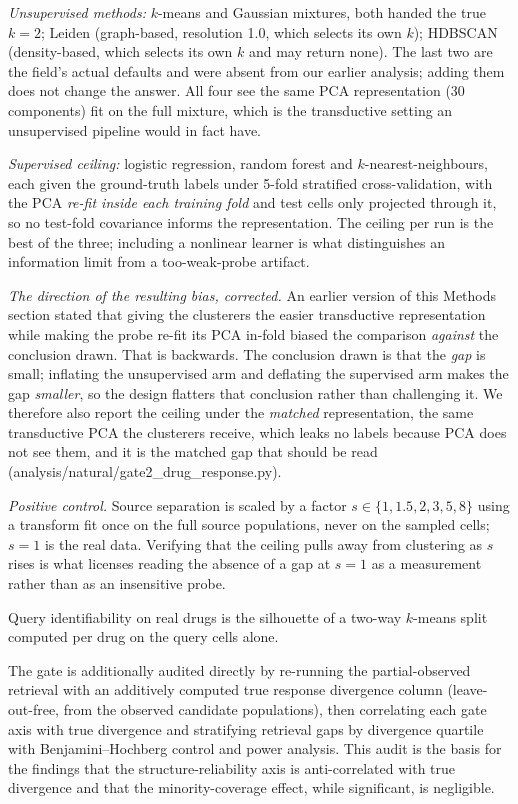 \documentclass[11pt,letterpaper]{article}
\begin{document}
\emph{Unsupervised methods:} $k$-means and Gaussian mixtures, both handed the true $k = 2$; Leiden\cite{Leiden}
(graph-based, resolution 1.0, which selects its own $k$); HDBSCAN\cite{HDBSCAN} (density-based, which
selects its own $k$ and may return none). The last two are the field's actual defaults and were absent from our
earlier analysis; adding them does not change the answer. All four see the same PCA representation
(30 components) fit on the full mixture, which is the transductive setting an unsupervised pipeline
would in fact have.

\emph{Supervised ceiling:} logistic regression, random forest and $k$-nearest-neighbours, each
given the ground-truth labels under 5-fold stratified cross-validation, with the PCA
\emph{re-fit inside each training fold} and test cells only projected through it, so no test-fold
covariance informs the representation. The ceiling per run is the best of the three; including a
nonlinear learner is what distinguishes an information limit from a too-weak-probe artifact.

\emph{The direction of the resulting bias, corrected.} An earlier version of this Methods section
stated that giving the clusterers the easier transductive representation while making the probe
re-fit its PCA in-fold biased the comparison \emph{against} the conclusion drawn. That is
backwards. The conclusion drawn is that the \emph{gap} is small; inflating the unsupervised arm
and deflating the supervised arm makes the gap \emph{smaller}, so the design flatters
that conclusion rather than challenging it. We therefore also report the ceiling under the
\emph{matched} representation, the same transductive PCA the clusterers receive, which leaks no
labels because PCA does not see them, and it is the matched gap that should be read
(analysis/natural/gate2\_drug\_response.py).

\emph{Positive control.} Source separation is scaled by a factor $s \in \{1, 1.5, 2, 3, 5, 8\}$
using a transform fit once on the full source populations, never on the sampled cells; $s = 1$ is
the real data. Verifying that the ceiling pulls away from clustering as $s$ rises is what licenses
reading the absence of a gap at $s = 1$ as a measurement rather than as an insensitive probe.

Query identifiability on real drugs is the silhouette of a two-way $k$-means split computed per
drug on the query cells alone.

The gate is additionally audited directly by re-running the partial-observed retrieval with
an additively computed true response divergence column (leave-out-free, from the
observed candidate populations), then correlating each gate axis with true divergence and
stratifying retrieval gaps by divergence quartile with Benjamini--Hochberg control and power
analysis. This audit is the basis for the findings that the structure-reliability axis is
anti-correlated with true divergence and that the minority-coverage effect, while
significant, is negligible.
\end{document}
